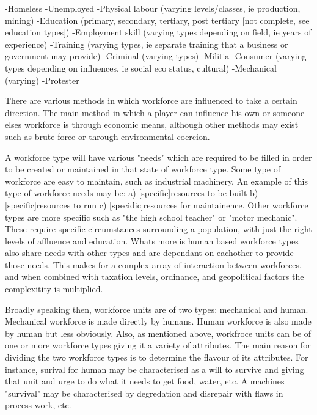 -Homeless
-Unemployed
-Physical labour (varying levels/classes, ie production, mining)
-Education (primary, secondary, tertiary, post tertiary [not complete, see education types])
-Employment skill (varying types depending on field, ie years of experience)
-Training (varying types, ie separate training that a business or government may provide)
-Criminal (varying types)
-Militia
-Consumer (varying types depending on influences, ie social eco status, cultural)
-Mechanical (varying) 
-Protester





There are various methods in which workforce are influenced to take a certain direction. The main method in which a player can influence his own or someone elses workforce is through economic means, although other methods may exist such as brute force or through environmental coercion. 

A workforce type will have various "needs" which are required to be filled in order to be created or maintained in that state of workforce type. Some type of workforce are easy to maintain, such as industrial machinery. An example of this type of workforce needs may be: a) [specific]resources to be built b) [specific]resources to run c) [specidic]resources for maintainence. Other workforce types are more specific such as "the high school teacher" or "motor mechanic". These require specific circumstances surrounding a population, with just the right levels of affluence and education. Whats more is human based workforce types also share needs with other types and are dependant on eachother to provide those needs. This makes for a complex array of interaction between workforces, and when combined with taxation levels, ordinance, and geopolitical factors the complexitity is multiplied.

Broadly speaking then, workforce units are of two types: mechanical and human. Mechanical workforce is made directly by humans. Human workforce is also made by human but less obviously. Also, as mentioned above, workfroce units can be of one or more workforce types giving it a variety of attributes. The main reason for dividing the two workforce types is to determine the flavour of its attributes. For instance, surival for human may be characterised as a will to survive and giving that unit and urge to do what it needs to get food, water, etc. A machines "survival" may be characterised by degredation and disrepair with flaws in process work, etc.

